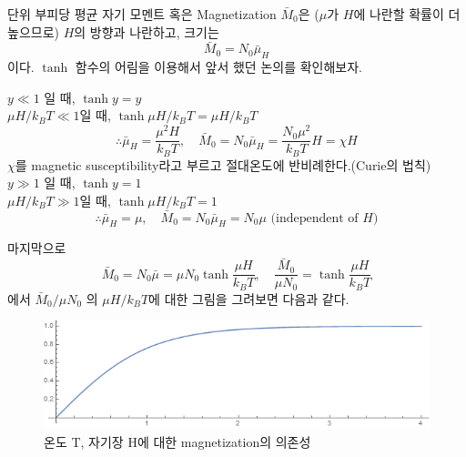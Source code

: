 \documentclass[a4paper,12pt]{article}
\begin{document}
단위 부피당 평균 자기 모멘트 혹은 Magnetization $\bar{M}_0$은 ($\mu$가 $H$에 나란할 확률이 더 높으므로) $H$의 방향과 나란하고, 크기는 $$\bar{M}_0=N_0\bar{\mu}_H$$이다.
$\tanh$ 함수의 어림을 이용해서 앞서 했던 논의를 확인해보자.
\begin{flushleft}
	$y\ll1$ 일 때, $\tanh y=y$\\
	$\mu H/k_BT\ll 1$일 때, $\tanh \mu H/k_BT=\mu H/k_B T$
	$$\therefore\bar{\mu}_H=\frac{\mu^2H}{k_BT}, \quad \bar{M}_0=N_0\bar{\mu}_H=\frac{N_0\mu^2}{k_BT}H=\chi H$$
$\chi$를 magnetic susceptibility라고 부르고 절대온도에 반비례한다.(Curie의 법칙)\\
	$y\gg1$ 일 때, $\tanh y=1$\\
	$\mu H/k_BT\gg 1$일 때, $\tanh \mu H/k_BT=1$
	$$\therefore\bar{\mu}_H=\mu,\quad \bar{M}_0=N_0\bar{\mu}_H=N_0\mu\mbox{ (independent of }H)$$
\end{flushleft}	
마지막으로 $$\bar{M}_0=N_0\bar{\mu}=\mu N_0\tanh{\frac{\mu H}{k_BT}}, \quad \frac{\bar{M}_0}{\mu N_0}=\tanh\frac{\mu H}{k_B T}$$ 에서 $\bar{M}_0/\mu N_0$ 의 $\mu H/k_BT$에 대한 그림을 그려보면 다음과 같다. 
	\begin{figure}[h]
	\centering
	\includegraphics[width=0.8\columnwidth]{fig1.png}
	\caption{온도 T, 자기장 H에 대한 magnetization의 의존성}
\end{figure}
\end{document}
